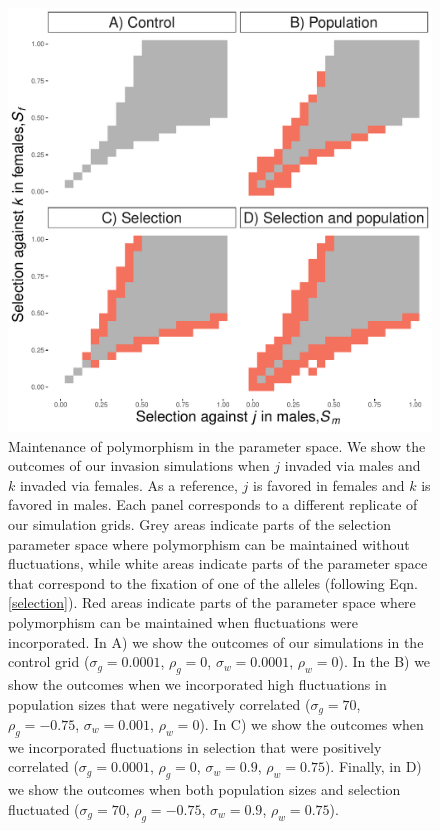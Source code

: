 \documentclass[12pt]{article}
\begin{document}
\begin{figure}[H]
  \centerline{\includegraphics[width=1\textwidth]{outcomes.pdf}}
  \caption{  Maintenance of polymorphism in the parameter space. We show the outcomes of our invasion simulations  when $j$ invaded via males and $k$ invaded via females. As a reference, $j$ is favored in females and $k$ is favored in males. Each panel corresponds to a different replicate of our simulation grids. Grey areas indicate parts of the selection parameter space where polymorphism can be maintained without fluctuations, while white areas indicate parts of the parameter space that correspond to the fixation of one of the alleles (following Eqn.\ref{selection}). Red areas indicate parts of the parameter space where polymorphism can be maintained when fluctuations were incorporated. In A) we show the outcomes of our simulations in the control grid ($\sigma_{g}=0.0001$, $\rho_{g}=0$, $\sigma_{w}=0.0001$, $\rho_{w}=0$). In the B) we show the outcomes when we incorporated high fluctuations in population sizes that were negatively correlated ($\sigma_{g}=70$, $\rho_{g}=-0.75$, $\sigma_{w}=0.001$, $\rho_{w}=0$). In C) we show the outcomes when we incorporated fluctuations in selection that were positively correlated  ($\sigma_{g}=0.0001$, $\rho_{g}=0$, $\sigma_{w}=0.9$, $\rho_{w}=0.75$). Finally, in D) we show the outcomes when both population sizes and selection fluctuated ($\sigma_{g}=70$, $\rho_{g}=-0.75$, $\sigma_{w}=0.9$, $\rho_{w}=0.75$). }
    \label{fig:outcomes}
\end{figure}
\end{document}
